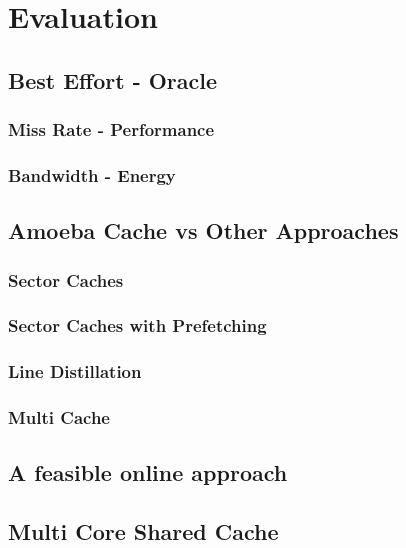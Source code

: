 
%
%

\chapter{Evaluation}
\label{five}

\section{Best Effort - Oracle}
\subsection{Miss Rate - Performance}
\subsection{Bandwidth - Energy}

\section{Amoeba Cache vs Other Approaches}
\subsection{Sector Caches}
\subsection{Sector Caches with Prefetching}
\subsection{Line Distillation}
\subsection{Multi Cache}

\section{A feasible online approach}

\section{Multi Core Shared Cache}



